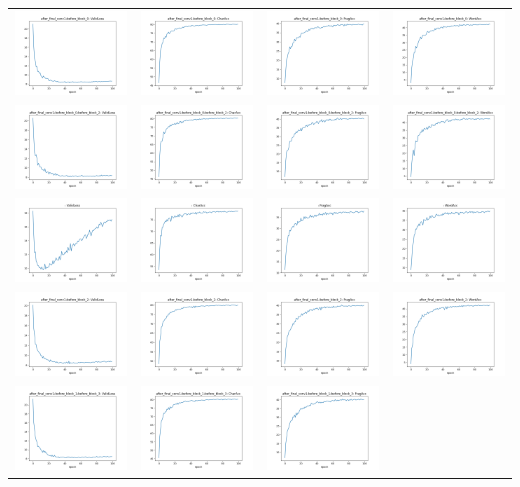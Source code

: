 \begin{longtable}{cccc}
\includegraphics[scale=0.2]{./images/mixup_position/after_final_conv1;before_block_0_ValidLoss.png} & \includegraphics[scale=0.2]{./images/mixup_position/after_final_conv1;before_block_0_CharAcc.png} & \includegraphics[scale=0.2]{./images/mixup_position/after_final_conv1;before_block_0_FragAcc.png} & \includegraphics[scale=0.2]{./images/mixup_position/after_final_conv1;before_block_0_WordAcc.png}\\
\includegraphics[scale=0.2]{./images/mixup_position/after_final_conv1;before_block_0;before_block_2_ValidLoss.png} & \includegraphics[scale=0.2]{./images/mixup_position/after_final_conv1;before_block_0;before_block_2_CharAcc.png} & \includegraphics[scale=0.2]{./images/mixup_position/after_final_conv1;before_block_0;before_block_2_FragAcc.png} & \includegraphics[scale=0.2]{./images/mixup_position/after_final_conv1;before_block_0;before_block_2_WordAcc.png}\\
\includegraphics[scale=0.2]{./images/mixup_position/_ValidLoss.png} & \includegraphics[scale=0.2]{./images/mixup_position/_CharAcc.png} & \includegraphics[scale=0.2]{./images/mixup_position/_FragAcc.png} & \includegraphics[scale=0.2]{./images/mixup_position/_WordAcc.png}\\
\includegraphics[scale=0.2]{./images/mixup_position/after_final_conv1;before_block_2_ValidLoss.png} & \includegraphics[scale=0.2]{./images/mixup_position/after_final_conv1;before_block_2_CharAcc.png} & \includegraphics[scale=0.2]{./images/mixup_position/after_final_conv1;before_block_2_FragAcc.png} & \includegraphics[scale=0.2]{./images/mixup_position/after_final_conv1;before_block_2_WordAcc.png}\\
\includegraphics[scale=0.2]{./images/mixup_position/after_final_conv1;before_block_1;before_block_3_ValidLoss.png} & \includegraphics[scale=0.2]{./images/mixup_position/after_final_conv1;before_block_1;before_block_3_CharAcc.png} & \includegraphics[scale=0.2]{./images/mixup_position/after_final_conv1;before_block_1;before_block_3_FragAcc.png} & 
\end{longtable}
